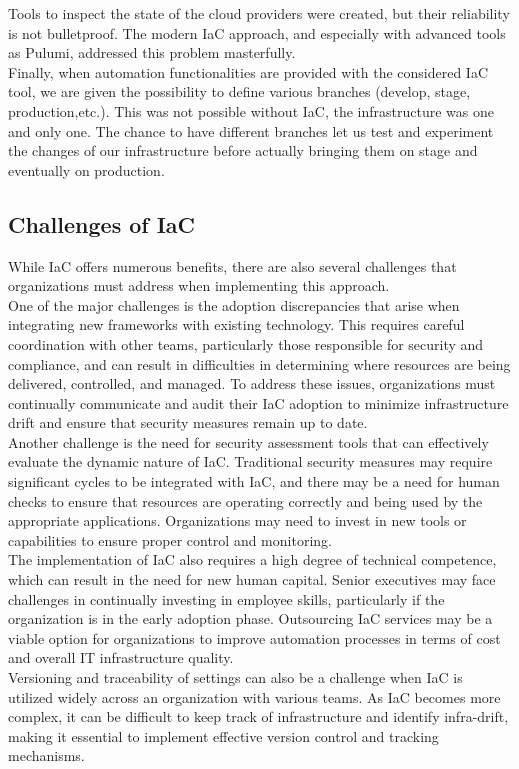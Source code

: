 Tools to inspect the state of the cloud providers were created, but their reliability is not bulletproof.
The modern IaC approach, and especially with advanced tools as Pulumi, addressed this problem masterfully.\\
Finally, when automation functionalities are provided with the considered IaC tool, we are given the possibility to define various branches (develop, stage, production,etc.).
This was not possible without IaC, the infrastructure was one and only one.
The chance to have different branches let us test and experiment the changes of our infrastructure before actually bringing them on stage and eventually on production.\\



\subsection{Challenges of IaC}

While IaC offers numerous benefits, there are also several challenges that organizations must address when implementing this approach.\\
One of the major challenges is the adoption discrepancies that arise when integrating new frameworks with existing technology. This requires careful coordination with other teams, particularly those responsible for security and compliance, and can result in difficulties in determining where resources are being delivered, controlled, and managed. To address these issues, organizations must continually communicate and audit their IaC adoption to minimize infrastructure drift and ensure that security measures remain up to date.\\
Another challenge is the need for security assessment tools that can effectively evaluate the dynamic nature of IaC. Traditional security measures may require significant cycles to be integrated with IaC, and there may be a need for human checks to ensure that resources are operating correctly and being used by the appropriate applications. Organizations may need to invest in new tools or capabilities to ensure proper control and monitoring.\\
The implementation of IaC also requires a high degree of technical competence, which can result in the need for new human capital. Senior executives may face challenges in continually investing in employee skills, particularly if the organization is in the early adoption phase. Outsourcing IaC services may be a viable option for organizations to improve automation processes in terms of cost and overall IT infrastructure quality.\\
Versioning and traceability of settings can also be a challenge when IaC is utilized widely across an organization with various teams. As IaC becomes more complex, it can be difficult to keep track of infrastructure and identify infra-drift, making it essential to implement effective version control and tracking mechanisms.\\


